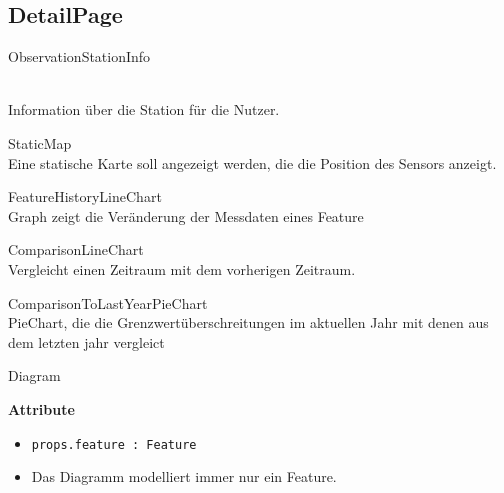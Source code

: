 \subsection{DetailPage}

   
    \begin{Class}{ObservationStationInfo}
      
            \\ Information über die Station für die Nutzer.
    \end{Class}

    \begin{Class}{StaticMap}
            \\Eine statische Karte soll angezeigt werden, die die Position des Sensors anzeigt.
    \end{Class}

  
    \begin{Class}{FeatureHistoryLineChart}
           \\ Graph zeigt die Veränderung der Messdaten eines Feature
    \end{Class}

    \begin{Class}{ComparisonLineChart}
            \\Vergleicht einen Zeitraum mit dem vorherigen Zeitraum.
    \end{Class}

    \begin{Class}{ComparisonToLastYearPieChart}
            \\ PieChart, die die Grenzwertüberschreitungen im aktuellen Jahr mit denen aus dem letzten jahr vergleict 
    \end{Class}

    \begin{Class}{Diagram}
        
        \textbf{Attribute}
        \begin{itemize}
            \item \texttt{props.feature : Feature}
            \item Das Diagramm modelliert immer nur ein Feature.
        \end{itemize}
    \end{Class}

